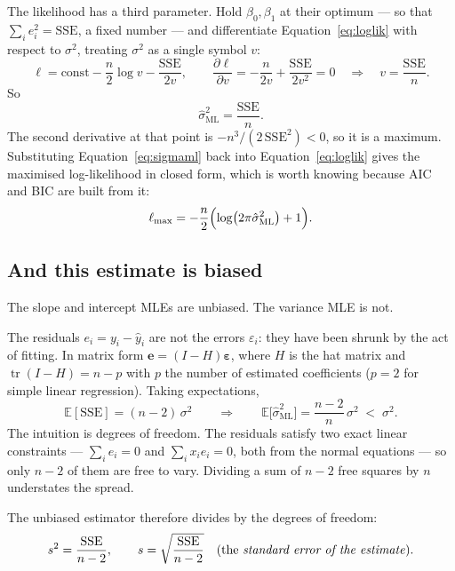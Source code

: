\documentclass[11pt]{article}
\begin{document}
The likelihood has a third parameter. Hold $\beta_0, \beta_1$ at their optimum
--- so that $\sum_i e_i^2 = \mathrm{SSE}$, a fixed number --- and differentiate
Equation~\eqref{eq:loglik} with respect to $\sigma^2$, treating $\sigma^2$ as
a single symbol $v$:
\[
  \ell = \text{const} - \frac{n}{2}\log v - \frac{\mathrm{SSE}}{2v},
  \qquad
  \frac{\partial \ell}{\partial v}
    = -\frac{n}{2v} + \frac{\mathrm{SSE}}{2v^2} = 0
  \quad\Longrightarrow\quad
  v = \frac{\mathrm{SSE}}{n}.
\]
So
\begin{equation}
  \hat\sigma^2_{\mathrm{ML}} = \frac{\mathrm{SSE}}{n}.
  \label{eq:sigmaml}
\end{equation}
The second derivative at that point is $-n^3/(2\,\mathrm{SSE}^2) < 0$, so it is
a maximum. Substituting Equation~\eqref{eq:sigmaml} back into
Equation~\eqref{eq:loglik} gives the maximised log-likelihood in closed form,
which is worth knowing because AIC and BIC are built from it:
\begin{equation}
  \ell_{\max}
    = -\frac{n}{2}\Bigl(\log\bigl(2\pi\hat\sigma^2_{\mathrm{ML}}\bigr) + 1\Bigr).
  \label{eq:lmax}
\end{equation}

\subsection{And this estimate is biased}
\label{sec:bias}

The slope and intercept MLEs are unbiased. The variance MLE is not.

The residuals $e_i = y_i - \hat y_i$ are not the errors $\varepsilon_i$: they
have been shrunk by the act of fitting. In matrix form
$\mathbf{e} = (I - H)\boldsymbol{\varepsilon}$, where $H$ is the hat matrix and
$\operatorname{tr}(I - H) = n - p$ with $p$ the number of estimated
coefficients ($p = 2$ for simple linear regression). Taking expectations,
\begin{equation}
  \mathbb{E}[\mathrm{SSE}] = (n - 2)\,\sigma^2
  \qquad\Longrightarrow\qquad
  \mathbb{E}\bigl[\hat\sigma^2_{\mathrm{ML}}\bigr]
    = \frac{n-2}{n}\,\sigma^2 \;<\; \sigma^2 .
  \label{eq:biased}
\end{equation}
The intuition is degrees of freedom. The residuals satisfy two exact linear
constraints --- $\sum_i e_i = 0$ and $\sum_i x_i e_i = 0$, both from the normal
equations --- so only $n-2$ of them are free to vary. Dividing a sum of $n-2$
free squares by $n$ understates the spread.

The unbiased estimator therefore divides by the degrees of freedom:
\begin{equation}
  s^2 = \frac{\mathrm{SSE}}{n-2},
  \qquad
  s = \sqrt{\frac{\mathrm{SSE}}{n-2}} \quad\text{(the \emph{standard error of
  the estimate})}.
  \label{eq:s2}
\end{equation}
\end{document}
